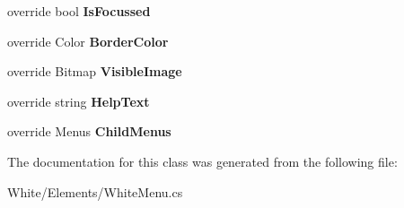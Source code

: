 \begin{DoxyCompactItemize}
\item 
\hypertarget{class_proto_test_1_1_golem_1_1_white_1_1_elements_1_1_white_menu_a7cf926d99b3683a8ad199f363f3869d2}{override bool {\bfseries Is\-Focussed}}\label{class_proto_test_1_1_golem_1_1_white_1_1_elements_1_1_white_menu_a7cf926d99b3683a8ad199f363f3869d2}

\item 
\hypertarget{class_proto_test_1_1_golem_1_1_white_1_1_elements_1_1_white_menu_a15bc18671e77af9e5a4ce18598b22710}{override Color {\bfseries Border\-Color}}\label{class_proto_test_1_1_golem_1_1_white_1_1_elements_1_1_white_menu_a15bc18671e77af9e5a4ce18598b22710}

\item 
\hypertarget{class_proto_test_1_1_golem_1_1_white_1_1_elements_1_1_white_menu_afcf49b797b7d03118aa14ee30eeb1017}{override Bitmap {\bfseries Visible\-Image}}\label{class_proto_test_1_1_golem_1_1_white_1_1_elements_1_1_white_menu_afcf49b797b7d03118aa14ee30eeb1017}

\item 
\hypertarget{class_proto_test_1_1_golem_1_1_white_1_1_elements_1_1_white_menu_aa3f451ebb1a8799e6133134d0e6e7636}{override string {\bfseries Help\-Text}}\label{class_proto_test_1_1_golem_1_1_white_1_1_elements_1_1_white_menu_aa3f451ebb1a8799e6133134d0e6e7636}

\item 
\hypertarget{class_proto_test_1_1_golem_1_1_white_1_1_elements_1_1_white_menu_a5ad960fc4698bdcc7f2cdeba9ba16ce2}{override Menus {\bfseries Child\-Menus}}\label{class_proto_test_1_1_golem_1_1_white_1_1_elements_1_1_white_menu_a5ad960fc4698bdcc7f2cdeba9ba16ce2}

\end{DoxyCompactItemize}


The documentation for this class was generated from the following file\-:\begin{DoxyCompactItemize}
\item 
White/\-Elements/White\-Menu.\-cs\end{DoxyCompactItemize}
